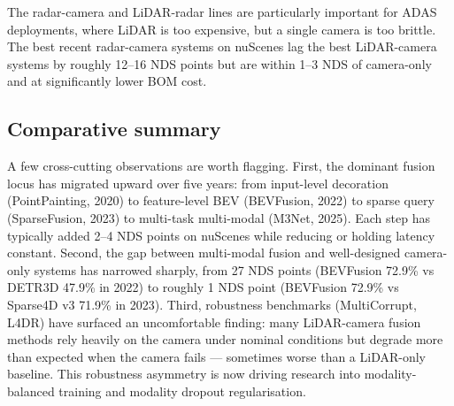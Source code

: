 \documentclass{article}
\begin{document}
The radar-camera and LiDAR-radar lines are particularly important for ADAS deployments, where LiDAR is too expensive, but a single camera is too brittle. The best recent radar-camera systems on nuScenes lag the best LiDAR-camera systems by roughly 12--16 NDS points but are within 1--3 NDS of camera-only and at significantly lower BOM cost.

\subsection{Comparative summary}\label{comparative-summary}

A few cross-cutting observations are worth flagging. First, the dominant fusion locus has migrated upward over five years: from input-level decoration (PointPainting, 2020) to feature-level BEV (BEVFusion, 2022) to sparse query (SparseFusion, 2023) to multi-task multi-modal (M3Net, 2025). Each step has typically added 2--4 NDS points on nuScenes while reducing or holding latency constant. Second, the gap between multi-modal fusion and well-designed camera-only systems has narrowed sharply, from 27 NDS points (BEVFusion 72.9\% vs DETR3D 47.9\% in 2022) to roughly 1 NDS point (BEVFusion 72.9\% vs Sparse4D v3 71.9\% in 2023). Third, robustness benchmarks (MultiCorrupt, L4DR) have surfaced an uncomfortable finding: many LiDAR-camera fusion methods rely heavily on the camera under nominal conditions but degrade more than expected when the camera fails --- sometimes worse than a LiDAR-only baseline. This robustness asymmetry is now driving research into modality-balanced training and modality dropout regularisation.
\end{document}
